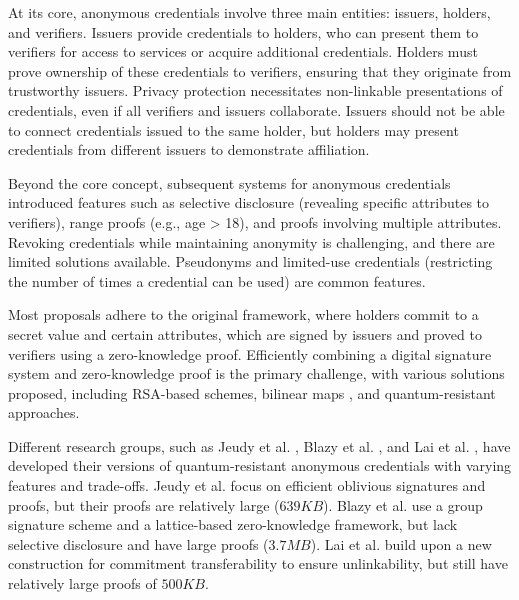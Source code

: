 At its core\cite{lysyanskayaSignatureSchemesApplications2002}, anonymous credentials involve three main entities: issuers, holders, and verifiers. Issuers provide credentials to holders, who can present them to verifiers for access to services or acquire additional credentials. Holders must prove ownership of these credentials to verifiers, ensuring that they originate from trustworthy issuers. Privacy protection necessitates non-linkable presentations of credentials, even if all verifiers and issuers collaborate. Issuers should not be able to connect credentials issued to the same holder, but holders may present credentials from different issuers to demonstrate affiliation.

Beyond the core concept, subsequent systems for anonymous credentials introduced features such as selective disclosure (revealing specific attributes to verifiers)\cite{camenischEfficientAttributesAnonymous2012}, range proofs (e.g., age > 18), and proofs involving multiple attributes. Revoking credentials while maintaining anonymity is challenging, and there are limited solutions available\cite{laponAnalysisRevocationStrategies2011}. Pseudonyms \cite{camenischDesignImplementationIdemix2002} and limited-use credentials (restricting the number of times a credential can be used) are common features\cite{camenischEfficientAttributesAnonymous2012}.

Most proposals adhere to the original framework\cite{camenischEfficientSystemNontransferable2001}, where holders commit to a secret value and certain attributes, which are signed by issuers and proved to verifiers using a zero-knowledge proof. Efficiently combining a digital signature system and zero-knowledge proof is the primary challenge, with various solutions proposed, including RSA-based schemes, bilinear maps \cite{camenischSignatureSchemesAnonymous2004,camenischAnonymousAttestationUsing2016a}, and quantum-resistant approaches\cite{bootleFrameworkPracticalAnonymous2023,blazyEfficientImplementationPostQuantum2023,jeudyLatticeSignatureEfficient2022,laiLatticebasedCommitTransferrableSignatures2023}.

Different research groups, such as Jeudy et al. \cite{jeudyLatticeSignatureEfficient2022}, Blazy et al. \cite{blazyEfficientImplementationPostQuantum2023}, and Lai et al. \cite{laiLatticebasedCommitTransferrableSignatures2023}, have developed their versions of quantum-resistant anonymous credentials with varying features and trade-offs. Jeudy et al. \cite{jeudyLatticeSignatureEfficient2022} focus on efficient oblivious signatures and proofs, but their proofs are relatively large ($639KB$). Blazy et al. use a group signature scheme and a lattice-based zero-knowledge framework, but lack selective disclosure and have large proofs ($3.7MB$). Lai et al. \cite{laiLatticebasedCommitTransferrableSignatures2023} build upon a new construction for commitment transferability to ensure unlinkability, but still have relatively large proofs of $500KB$.

